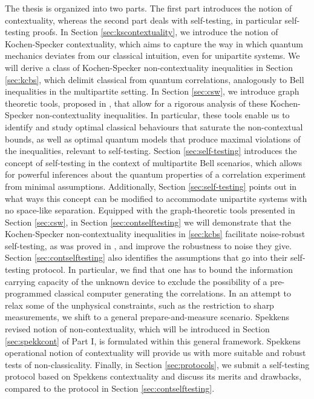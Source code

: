 The thesis is organized into two parts. The first part introduces the notion of contextuality, whereas the second part deals with self-testing, in particular self-testing proofs.
In Section \ref{sec:kscontextuality}, we introduce the notion of Kochen-Specker contextuality, which aims to capture the way in which quantum mechanics deviates from our classical intuition, even for unipartite systems. We will derive a class of Kochen-Specker non-contextuality inequalities in Section \ref{sec:kcbs}, which delimit classical from quantum correlations, analogously to Bell inequalities in the multipartite setting. In Section \ref{sec:csw}, we introduce graph theoretic tools, proposed in \cite{Cabello2014}, that allow for a rigorous analysis of these Kochen-Specker non-contextuality inequalities. In particular, these tools enable us to identify and study optimal classical behaviours that saturate the non-contextual bounds, as well as optimal quantum models that produce maximal violations of the inequalities, relevant to self-testing. Section \ref{sec:self-testing} introduces the concept of self-testing in the context of multipartite Bell scenarios, which allows for powerful inferences about the quantum properties of a correlation experiment from minimal assumptions. Additionally, Section \ref{sec:self-testing} points out in what ways this concept can be modified to accommodate unipartite systems with no space-like separation. Equipped with the graph-theoretic tools presented in Section \ref{sec:csw}, in Section \ref{sec:contselftesting} we will demonstrate that the Kochen-Specker non-contextuality inequalities in \ref{sec:kcbs} facilitate noise-robust self-testing, as was proved in \cite{Bharti2019}, and improve the robustness to noise they give. Section \ref{sec:contselftesting} also identifies the assumptions that go into their self-testing protocol. In particular, we find that one has to bound the information carrying capacity of the unknown device to exclude the possibility of a pre-programmed classical computer generating the correlations. In an attempt to relax some of the unphysical constraints, such as the restriction to sharp measurements, we shift to a general prepare-and-measure scenario. Spekkens revised notion of non-contextuality, which will be introduced in Section \ref{sec:spekkcont} of Part I, is formulated within this general framework. Spekkens operational notion of contextuality will provide us with more suitable and robust tests of non-classicality.
Finally, in Section \ref{sec:protocols}, we submit a self-testing protocol based on Spekkens contextuality and discuss its merits and drawbacks, compared to the protocol in Section \ref{sec:contselftesting}.
